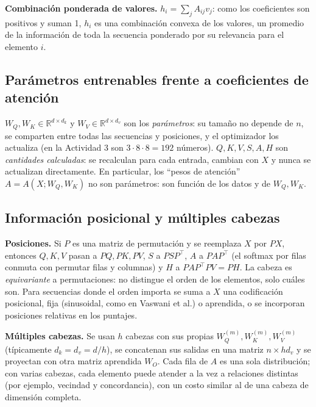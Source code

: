 \documentclass[10pt]{article}
\newcommand{\R}{\mathbb{R}}
\begin{document}
\textbf{Combinación ponderada de valores.} $h_i = \sum_j A_{ij} v_j$: como los coeficientes son
positivos y suman 1, $h_i$ es una combinación convexa de los valores, un promedio de la información
de toda la secuencia ponderado por su relevancia para el elemento $i$.

\subsection{Parámetros entrenables frente a coeficientes de atención}
$W_Q, W_K\in\R^{d\times d_k}$ y $W_V\in\R^{d\times d_v}$ son los \emph{parámetros}: su tamaño no
depende de $n$, se comparten entre todas las secuencias y posiciones, y el optimizador los actualiza
(en la Actividad 3 son $3\cdot 8\cdot 8 = 192$ números). $Q,K,V,S,A,H$ son \emph{cantidades
calculadas}: se recalculan para cada entrada, cambian con $X$ y nunca se actualizan directamente.
En particular, los ``pesos de atención'' $A = A(X; W_Q, W_K)$ no son parámetros: son función de los
datos y de $W_Q, W_K$.

\subsection{Información posicional y múltiples cabezas}
\textbf{Posiciones.} Si $P$ es una matriz de permutación y se reemplaza $X$ por $PX$, entonces
$Q, K, V$ pasan a $PQ, PK, PV$, $S$ a $PSP^\top$, $A$ a $PAP^\top$ (el softmax por filas conmuta con
permutar filas y columnas) y $H$ a $PAP^\top PV = PH$. La cabeza es \emph{equivariante} a
permutaciones: no distingue el orden de los elementos, solo cuáles son. Para secuencias donde el
orden importa se suma a $X$ una codificación posicional, fija (sinusoidal, como en
Vaswani et al.) o aprendida, o se incorporan posiciones relativas en los puntajes.

\textbf{Múltiples cabezas.} Se usan $h$ cabezas con sus propias $W_Q^{(m)}, W_K^{(m)}, W_V^{(m)}$
(típicamente $d_k = d_v = d/h$), se concatenan sus salidas en una matriz $n\times hd_v$ y se proyectan
con otra matriz aprendida $W_O$. Cada fila de $A$ es una sola distribución; con varias cabezas, cada
elemento puede atender a la vez a relaciones distintas (por ejemplo, vecindad y concordancia), con un
costo similar al de una cabeza de dimensión completa.
\end{document}
